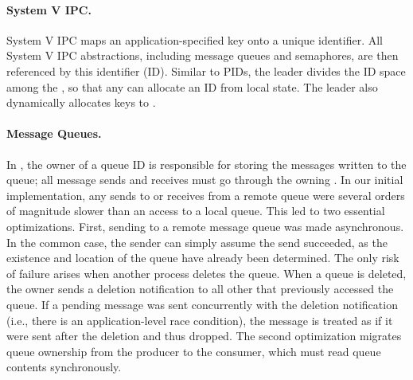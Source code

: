 \paragraph{System V IPC.} System V IPC
maps an application-specified key onto a unique identifier.
All System V IPC abstractions, including message queues and semaphores,
are then referenced by this identifier (ID).
Similar to PIDs, 
the leader divides the ID space among the \picoprocs{}, so that any \picoproc{}
can allocate an ID from local state. %
The leader also dynamically allocates keys to \picoprocs{}.

\paragraph{Message Queues.} In \sysname{}, the owner of a queue ID is responsible for 
storing the messages written to the queue; all message sends and receives must 
go through the owning \picoproc{}.  
In our initial implementation, any sends to or receives from a remote queue were several
orders of magnitude slower than an access to a local queue.
This led to two essential optimizations.  
First, sending to a remote
message queue was made asynchronous.  In the common case, the sender can simply assume 
the send succeeded, as the existence and location of the queue have already been determined.
The only risk of failure arises when another process deletes the queue.
When a queue is deleted, the owner sends a deletion notification to all other \picoprocs{}
that previously accessed the queue.
If a pending message was sent concurrently with the deletion notification 
(i.e., there is an application-level race condition), 
the message is treated as if it were sent after the deletion and thus dropped.
The second optimization migrates queue ownership from the producer to the consumer,
which must read queue contents synchronously.


